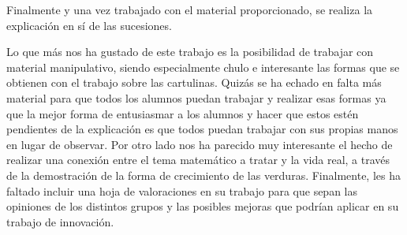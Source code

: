 Finalmente y una vez trabajado con el material proporcionado, se realiza la explicación en sí de las sucesiones.

Lo que más nos ha gustado de este trabajo es la posibilidad de trabajar con material manipulativo, siendo especialmente chulo e interesante las formas que se obtienen con el trabajo sobre las cartulinas. Quizás se ha echado en falta más material para que todos los alumnos puedan trabajar y realizar esas formas ya que la mejor forma de entusiasmar a los alumnos y hacer que estos estén pendientes de la explicación es que todos puedan trabajar con sus propias manos en lugar de observar. Por otro lado nos ha parecido muy interesante el hecho de realizar una conexión entre el tema matemático a tratar y la vida real, a través de la demostración de la forma de crecimiento de las verduras. Finalmente, les ha faltado incluir una hoja de valoraciones en su trabajo para que sepan las opiniones de los distintos grupos y las posibles mejoras que podrían aplicar en su trabajo de innovación.